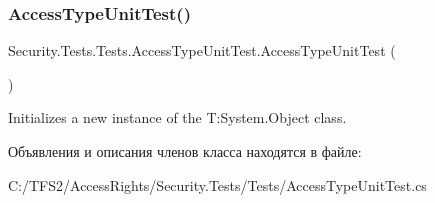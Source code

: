 \subsubsection{\texorpdfstring{Access\+Type\+Unit\+Test()}{AccessTypeUnitTest()}}
{\footnotesize\ttfamily Security.\+Tests.\+Tests.\+Access\+Type\+Unit\+Test.\+Access\+Type\+Unit\+Test (\begin{DoxyParamCaption}{ }\end{DoxyParamCaption})}



Initializes a new instance of the T\+:\+System.\+Object class. 



Объявления и описания членов класса находятся в файле\+:\begin{DoxyCompactItemize}
\item 
C\+:/\+T\+F\+S2/\+Access\+Rights/\+Security.\+Tests/\+Tests/Access\+Type\+Unit\+Test.\+cs\end{DoxyCompactItemize}
